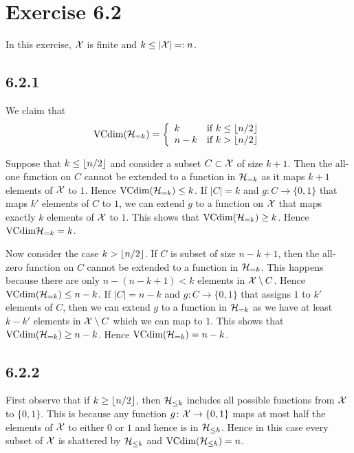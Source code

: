 \section*{Exercise 6.2}

In this exercise, $\mathcal{X}$ is finite and $k \leq |\mathcal{X}| =: n$.

\subsection*{6.2.1}

We claim that
\[\text{VCdim}(\mathcal{H}_{= k})
= \left \{ \begin{array}{ll}
                k     & \text{if } k \leq \left \lfloor n / 2 \right \rfloor \\
                n - k & \text{if } k > \left \lfloor n / 2 \right \rfloor
           \end{array} \right .
\]

Suppose that $k \leq \left \lfloor n / 2 \right \rfloor$ and consider a subset $C \subset \mathcal{X}$
of size $k + 1$. Then the all-one function on $C$ cannot be
extended to a function in $\mathcal{H}_{= k}$ as it maps $k + 1$ elements
of $\mathcal{X}$ to $1$. Hence $\text{VCdim}(\mathcal{H}_{= k}) \leq k$. If $|C| = k$
and $g \colon C \rightarrow \{0, 1\}$ that maps $k'$ elements of $C$ to $1$,
we can extend $g$ to a function on $\mathcal{X}$ that maps exactly $k$ elements of
$\mathcal{X}$ to $1$.  This shows that $\text{VCdim}(\mathcal{H}_{= k}) \geq k$. Hence
$\text{VCdim}{\ensuremath{\mathcal{H}}_{= k}} = k$.

Now consider the case $k > \left \lfloor n / 2 \right \rfloor$. If $C$ is subset of size
$n - k + 1$, then the all-zero function on $C$ cannot be extended
to a function in $\mathcal{H}_{= k}$. This happens because there are only
$n - (n - k + 1) < k$ elements in $\mathcal{X} \setminus C$. Hence
$\text{VCdim}(\mathcal{H}_{= k}) \leq n - k$. If $|C| = n - k$ and
$g \colon C \rightarrow \{0, 1\}$ that assigns $1$ to $k'$
elements of $C$, then we can extend $g$ to a function in
$\mathcal{H}_{= k}$ as we have at least $k - k'$ elements in
$\mathcal{X} \setminus C$ which we can map to $1$. This shows that
$\text{VCdim}(\mathcal{H}_{= k}) \geq n - k$. Hence
$\text{VCdim}(\mathcal{H}_{= k}) = n - k$.

\subsection*{6.2.2}

First observe that if $k \geq \left \lfloor n / 2 \right \rfloor$, then $\mathcal{H}_{\leq k}$ includes
all possible functions from $\mathcal{X}$ to $\{0, 1\}$. This is because any function
$g \colon \mathcal{X} \rightarrow \{0, 1\}$ maps at most half the elements of
$\mathcal{X}$ to either $0$ or $1$ and hence is in $\mathcal{H}_{\leq k}$.
Hence in this case every subset of $\mathcal{X}$ is shattered by $\mathcal{H}_{\leq k}$
and $\text{VCdim} (\mathcal{H}_{\leq k}) = n$.

